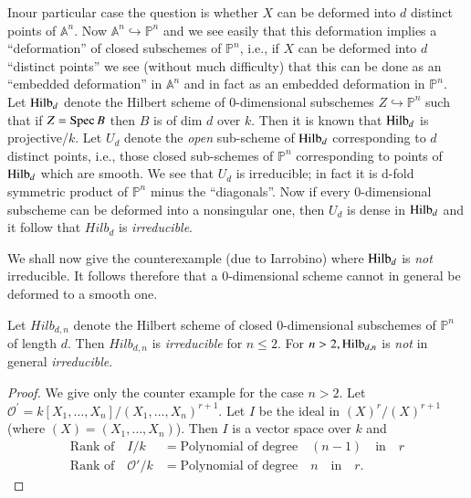 {In\pageoriginale our particular case the question is whether $X$ can be deformed into $d$ distinct points of $\mathbb{A}^{n}$. Now $\mathbb{A}^{n}\hookrightarrow \mathbb{P}^{n}$ and we see easily that this deformation implies a ``deformation'' of closed subschemes of $\mathbb{P}^{n}$, i.e., if $X$ can be deformed into $d$ ``distinct points'' we see (without much difficulty) that this can be done as an ``embedded deformation'' in $\mathbb{A}^{n}$ and in fact as an embedded deformation in $\mathbb{P}^{n}$. Let $\operatorname{Hilb}_{d}$ denote the Hilbert scheme of $0$-dimensional subschemes $Z\hookrightarrow\mathbb{P}^{n}$ such that if $Z=\operatorname{Spec} B$ then $B$ is of dim $d$ over $k$. Then it is known that $\operatorname{Hilb}_{d}$ is projective/$k$. Let $U_{d}$ denote the {\em open} sub-scheme of $\operatorname{Hilb}_{d}$ corresponding to $d$ distinct points, i.e., those closed sub-schemes of $\mathbb{P}^{n}$ corresponding to points of $\operatorname{Hilb}_{d}$ which are smooth. We see that $U_{d}$ is irreducible; in fact it is d-fold symmetric product of $\mathbb{P}^{n}$ minus the ``diagonals''. Now if every 0-dimensional subscheme can be deformed into a nonsingular one, then $U_{d}$ is dense in $\operatorname{Hilb}_{d}$ and it follow that $Hilb_{d}$ is {\em irreducible}.

We shall now give the counterexample (due to Iarrobino) where $\operatorname{Hilb}_{d}$ is {\em not} irreducible. It follows therefore that a 0-dimensional scheme cannot in general be deformed to a smooth one.

\begin{theorem}\label{part1-thm2.1}%
Let $Hilb_{d,n}$ denote the Hilbert scheme of closed $0$-dimen\-sional subschemes of $\mathbb{P}^{n}$ of length $d$. Then $Hilb_{d,n}$ is {\em irreducible} for $n\le2$. For $n>2, \operatorname{Hilb}_{d,n}$ is {\em not} in general {\em irreducible}.
\end{theorem}

\begin{proof}
We give only the counter example for the case $n>2$. Let $\mathscr{O}^{'}=k[X_{1},\ldots,X_{n}]/(X_{1},\ldots,X_{n})^{r+1}$. Let $I$ be the ideal in $(X)^{r}/(X)^{r+1}$ (where $(X)=(X_{1},\ldots,X_{n})$). Then $I$ is a vector space over $k$ and
\begin{align*}
\text{Rank of}\quad I/k&=\text{Polynomial of degree}\quad (n-1)\quad \text{in}\quad r\\
\text{Rank of}\quad \mathscr{O}'/k&=\text{Polynomial of degree}\quad n\quad \text{in}\quad r.
\end{align*}\pageoriginale
\end{proof}

}
